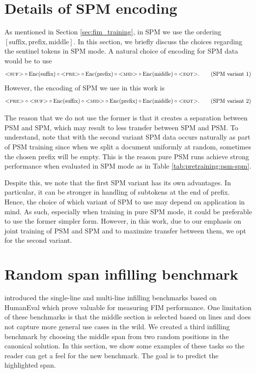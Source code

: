 \documentclass[postscript]{article}
\begin{document}
\section{Details of SPM encoding}\label{appendix:spm_details}
As mentioned in Section \ref{sec:fim_training}, in  SPM we use the ordering $[\text{suffix}, \text{prefix}, \text{middle}]$. In this section, we briefly discuss the choices regarding the sentinel tokens in SPM mode. A natural choice of encoding for SPM data would be to use
\[ \textsc{<suf>}\circ \text{Enc}(\text{suffix}) \circ \textsc{<pre>}  \circ \text{Enc}(\text{prefix})\circ \textsc{<mid>} \circ \text{Enc}(\text{middle}) \circ \textsc{<eot>}. \tag{SPM variant 1}
\] 
However, the encoding of SPM we use in this work is
\[
 \textsc{<pre>}  \circ \textsc{<suf>}\circ \text{Enc}(\text{suffix}) \circ \textsc{<mid>}\circ \text{Enc}(\text{prefix})\circ \text{Enc}(\text{middle}) \circ \textsc{<eot>}. \tag{SPM variant 2}
\]

The reason that we do not use the former is that it creates a separation between PSM and SPM, which may result to less transfer between SPM and PSM. To understand, note that with the second variant SPM data occurs naturally as part of PSM training since when we split a document uniformly at random, sometimes the chosen prefix will be empty. This is the reason pure PSM runs achieve strong performance when evaluated in SPM mode as in Table \ref{tab:pretraining:psm-spm}. 

Despite this, we note that the first SPM variant has its own advantages. In particular, it can be stronger in handling of subtokens at the end of prefix. Hence, the choice of which variant of SPM to use may depend on application in mind. As such, especially when training in pure SPM mode, it could be preferable to use the former simpler form. However, in this work, due to our emphasis on joint training of PSM and SPM and to maximize transfer between them, we opt for the second variant.
\section{Random span infilling benchmark}
\label{appendix:random-span-infilling}

\cite{incoder} introduced the single-line and multi-line infilling benchmarks based on HumanEval which prove valuable for measuring FIM performance. One limitation of these benchmarks is that the middle section is selected based on lines and does not capture more general use cases in the wild. We created a third infilling benchmark by choosing the middle span from two random  positions in the canonical solution. In this section, we show some examples of these tasks so the reader can get a feel for the new benchmark. The goal is to predict the highlighted span.
\end{document}
